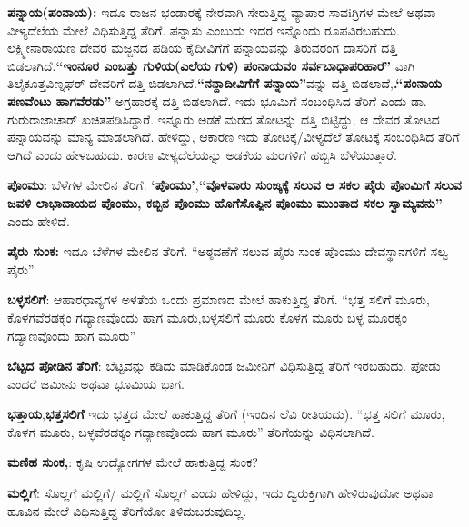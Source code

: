 \textbf{ಪನ್ನಾಯ(ಪಂನಾಯ):} ಇದೂ ರಾಜನ ಭಂಡಾರಕ್ಕೆ ನೇರವಾಗಿ ಸೇರುತ್ತಿದ್ದ ವ್ಯಾಪಾರ ಸಾವiಗ್ರಿಗಳ ಮೇಲೆ ಅಥವಾ ವೀಳ್ಯದೆಲೆಯ ಮೇಲೆ ವಿಧಿಸುತ್ತಿದ್ದ ತೆರಿಗೆ. ಪನ್ನಾಸು ಎಂಬುದು ಇದರ ಇನ್ನೊಂದು ರೂಪವಿರಬಹುದು. ಲಕ್ಷ್ಮೀನಾರಾಯಣ ದೇವರ ಮಜ್ಜನದ ಪಡಿಯ ಕೈದೀವಿಗೆಗೆ ಪನ್ನಾಯವನ್ನು ತಿರುವರಂಗ ದಾಸರಿಗೆ ದತ್ತಿ ಬಿಡಲಾಗಿದೆ.\textbf{“ಇಂನೂರ ಎಂಬತ್ತು ಗುಳಿಯ(ಎಲೆಯ ಗುಳಿ) ಪಂನಾಯವಂ ಸರ್ವಬಾಧಾಪರಿಹಾರ”} ವಾಗಿ ತಿಲೈಕೂತ್ತವಿಣ್ನಘರ್​ ದೇವರಿಗೆ ದತ್ತಿ ಬಿಡಲಾಗಿದೆ.\textbf{“ನನ್ದಾದೀವಿಗೆಗೆ ಪನ್ನಾಯ”}ವನ್ನು ದತ್ತಿ ಬಿಡಲಾದೆ,\textbf{.“ಪಂನಾಯ ಪಣವೆಂಟು ಹಾಗವೆರಡು”} ಅಗ್ರಹಾರಕ್ಕೆ ದತ್ತಿ ಬಿಡಲಾಗಿದೆ. ಇದು ಭೂಮಿಗೆ ಸಂಬಂಧಿಸಿದ ತೆರಿಗೆ ಎಂದು ಡಾ. ಗುರುರಾಜಾಚಾರ್​ ಖಚಿತಪಡಿಸಿದ್ದಾರೆ. ಇನ್ನೂರು ಅಡಕೆ ಮರದ ತೋಟನ್ನು ದತ್ತಿ ಬಿಟ್ಟಿದ್ದು, ಆ ದೇವರ ತೋಟದ ಪನ್ನಾಯವನ್ನು ಮಾನ್ಯ ಮಾಡಲಾಗಿದೆ. ಹೇಳಿದ್ದು, ಆಕಾರಣ ಇದು ತೋಟಕ್ಕೆ/ವೀಳ್ಯದೆಲೆ ತೋಟಕ್ಕೆ ಸಂಬಂಧಿಸಿದ ತೆರಿಗೆ ಆಗಿದೆ ಎಂದು ಹೇಳಬಹುದು. ಕಾರಣ ವೀಳ್ಯದೆಲೆಯನ್ನು ಅಡಕೆಯ ಮರಗಳಿಗೆ ಹಬ್ಬಿಸಿ ಬೆಳೆಯುತ್ತಾರೆ.

\textbf{ಪೊಂಮು:} ಬೆಳೆಗಳ ಮೇಲಿನ ತೆರಿಗೆ.\textbf{ ‘ಪೊಂಮು’},\textbf{“ವೊಳವಾರು ಸುಂಙ್ಕಕ್ಕೆ ಸಲುವ ಆ ಸಕಲ ಪೈರು ಪೊಂಮಿಗೆ ಸಲುವ ಜವಳಿ ಲಾಭಾದಾಯದ ಪೊಂಮು, ಕಬ್ಬಿನ ಪೊಂಮು ಹೊಗೆಸೊಪ್ಪಿನ ಪೊಂಮು ಮುಂತಾದ ಸಕಲ ಸ್ವಾಮ್ಯವನು”} ಎಂದು ಹೇಳಿದೆ.

\textbf{ಪೈರು ಸುಂಕ: } ಇದೂ ಬೆಳೆಗಳ ಮೇಲಿನ ತೆರಿಗೆ. “ಅಠ್ಠವಣೆಗೆ ಸಲುವ ಪೈರು ಸುಂಕ ಪೊಂಮು ದೇವಸ್ಥಾನಗಳಿಗೆ ಸಲ್ವ ಪೈರು”

\textbf{ಬಳ್ಳಸಲಿಗೆ}: ಆಹಾರಧಾನ್ಯಗಳ ಅಳತೆಯ ಒಂದು ಪ್ರಮಾಣದ ಮೇಲೆ ಹಾಕುತ್ತಿದ್ದ ತೆರಿಗೆ. “ಭತ್ತ ಸಲಿಗೆ ಮೂರು, ಕೊಳಗವೆರಡಕ್ಕಂ ಗದ್ಯಾಣವೊಂದು ಹಾಗ ಮೂರು,ಬಳ್ಳಸಲಿಗೆ ಮೂರು ಕೊಳಗ ಮೂರು ಬಳ್ಳ ಮೂರಕ್ಕಂ ಗದ್ಯಾಣವೊಂದು ಹಾಗ ಮೂರು”

\textbf{ಬೆಟ್ಟದ ಪೋಡಿನ ತೆರಿಗೆ}: ಬೆಟ್ಟವನ್ನು ಕಡಿದು ಮಾಡಿಕೊಂಡ ಜಮೀನಿಗೆ ವಿಧಿಸುತ್ತಿದ್ದ ತೆರಿಗೆ ಇರಬಹುದು. ಪೋಡು ಎಂದರೆ ಜಮೀನು ಅಥವಾ ಭೂಮಿಯ ಭಾಗ.

\textbf{ಭತ್ತಾಯ},\textbf{ಭತ್ತಸಲಿಗೆ} ಇದು ಭತ್ತದ ಮೇಲೆ ಹಾಕುತ್ತಿದ್ದ ತೆರಿಗೆ (ಇಂದಿನ ಲೆವಿ ರೀತಿಯದು). “ಭತ್ತ ಸಲಿಗೆ ಮೂರು, ಕೊಳಗ ಮೂರು, ಬಳ್ಳವೆರಡಕ್ಕಂ ಗದ್ಯಾಣವೊಂದು ಹಾಗ ಮೂರು” ತೆರಿಗೆಯನ್ನು ವಿಧಿಸಲಾಗಿದೆ.

\textbf{ಮಣಿಹ ಸುಂಕ,}: ಕೃಷಿ ಉದ್ಯೋಗಗಳ ಮೇಲೆ ಹಾಕುತ್ತಿದ್ದ ಸುಂಕ?

\textbf{ಮಲ್ಲಿಗೆ}: ಸೊಲ್ಲಗೆ ಮಲ್ಲಿಗೆ/ ಮಲ್ಲಿಗೆ ಸೊಲ್ಲಗೆ ಎಂದು ಹೇಳಿದ್ದು, ಇದು ದ್ವಿರುಕ್ತಿಗಾಗಿ ಹೇಳಿರುವುದೋ ಅಥವಾ ಹೂವಿನ ಮೇಲೆ ವಿಧಿಸುತ್ತಿದ್ದ ತೆರಿಗೆಯೋ ತಿಳಿದುಬರುವುದಿಲ್ಲ.

